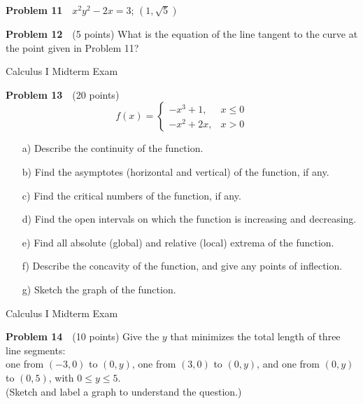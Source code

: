 \documentclass[10pt]{article}
\newcommand{\prob}[1]{\vspace{5mm} \noindent \textbf{Problem #1} \,\,}
\newcommand{\header}{\begin{center}
Calculus I Midterm Exam 
\end{center}
}
\begin{document}

\prob{11} $x^2 y^2 - 2x = 3$; $(1, \sqrt{5})$ %

\vspace{40mm}




\prob{12} (5 points) What is the equation of the line tangent to the curve at the point given in Problem 11?


\pagebreak

\header

\prob{13} (20 points) %
\[ f(x) = \left\{ \begin{array}{ll} -x^3 + 1, & x \leq 0 \\ -x^2 + 2x, & x > 0 \end{array} \right. \]
\begin{itemize}
\item[a) ] Describe the continuity of the function.
\item[b) ] Find the asymptotes (horizontal and vertical) of the function, if any.
\item[c) ] Find the critical numbers of the function, if any.
\item[d) ] Find the open intervals on which the function is increasing and decreasing.
\item[e) ] Find all absolute (global) and relative (local) extrema of the function.
\item[f) ] Describe the concavity of the function, and give any points of inflection.
\item[g) ] Sketch the graph of the function.
\end{itemize}








\pagebreak 

\header

\prob{14} (10 points) Give the $y$ that minimizes the total length of three line segments: \\
one from $(-3,0)$ to $(0,y)$, one from $(3,0)$ to $(0,y)$, and one from $(0,y)$ to $(0,5)$, with $0 \leq y \leq 5$. \\
(Sketch and label a graph to understand the question.)

\end{document}
